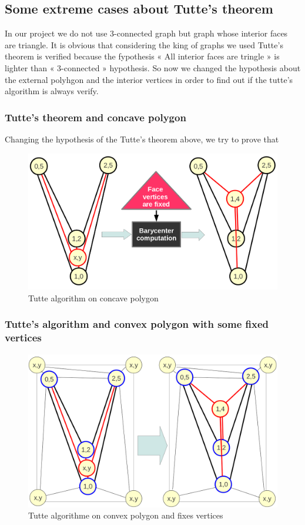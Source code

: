 \subsection{Some extreme cases about Tutte's theorem}
In our project we do not use 3-connected graph but graph whose interior faces are triangle. It is obvious that considering the king of graphs we used Tutte's theorem is verified because the fypothesis « All interior faces are tringle » is lighter than « 3-connected » hypothesis. So now we changed the hypothesis about the external polyhgon and the interior vertices in order to find out if the tutte's algorithm is always verify.  

\subsubsection{Tutte's theorem and concave polygon}
Changing the hypothesis of the Tutte's theorem above, we try to prove that 

\begin {figure}[H]
  \centering
  \includegraphics[scale=0.3]{img/tutte2.png}
  \caption{Tutte algorithm on concave polygon}
  \label{struct3}
\end {figure}

\subsubsection{Tutte's algorithm and convex polygon with some fixed vertices}


\begin {figure}[H]
  \centering
  \includegraphics[scale=0.3]{img/tutte3.png}
  \caption{Tutte algorithme on convex polygon and fixes vertices}
  \label{struct3}
\end {figure}
